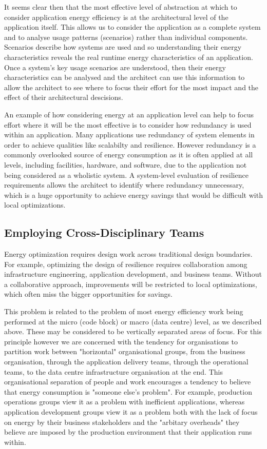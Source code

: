 It seems clear then that the most effective level of abstraction at which to consider application energy efficiency is at the architectural level of the application itself.  This allows us to consider the application as a complete system and to analyse usage patterns (scenarios) rather than individual components.  Scenarios describe how systems are used and so understanding their energy characteristics reveals the real runtime energy characteristics of an application.  Once a system's key usage scenarios are understood, then their energy characteristics can be analysed and the architect can use this information to allow the architect to see where to focus their effort for the most impact and the effect of their architectural descisions.

An example of how considering energy at an application level can help to focus effort where it will be the most effective is to consider how redundancy is used within an application.  Many applications use redundancy of system elements in order to achieve qualities like scalabilty and resilience.  However redundancy is a commonly overlooked source of energy consumption as it is often applied at all levels, including facilities, hardware, and software, due to the application not being considered as a wholistic system.   A system-level evaluation of resilience requirements allows the architect to identify where redundancy unnecessary, which is a huge opportunity to achieve energy savings that would be difficult with local optimizations.

\subsection{Employing Cross-Disciplinary Teams}

Energy optimization requires design work across traditional design boundaries. For example, optimizing the design of resilience requires collaboration among infrastructure engineering, application development, and business teams. Without a collaborative approach, improvements will be restricted to local optimizations, which often miss the bigger opportunities for savings.

This problem is related to the problem of most energy efficiency work being performed at the micro (code block) or macro (data centre) level, as we described above.  These may be considered to be vertically separated areas of focus.  For this principle however we are concerned with the tendency for organisations to partition work between "horizontal" organisational groups, from the business organisation, through the application delivery teams, through the operational teams, to the data centre infrastructure organisation at the end.  This organisational separation of people and work encourages a tendency to believe that energy consumption is "someone else's problem".  For example, production operations groups view it as a problem with inefficient applications, whereas application development groups view it as a problem both with the lack of focus on energy by their business stakeholders and the "arbitary overheads" they believe are imposed by the production environment that their application runs within.

